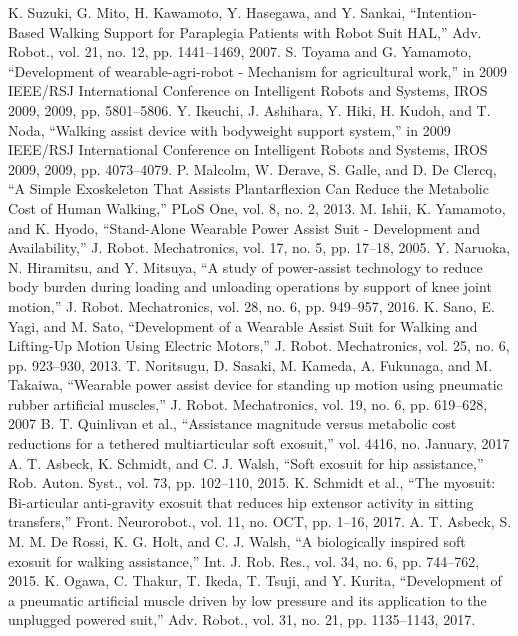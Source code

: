 \documentclass[paper,JRM,paper]{jaciiiarticle}
\begin{document}
\begin{thebibliography}{99}

	K. Suzuki, G. Mito, H. Kawamoto, Y. Hasegawa, and Y. Sankai, “Intention-Based Walking Support for Paraplegia Patients with Robot Suit HAL,” Adv. Robot., vol. 21, no. 12, pp. 1441–1469, 2007.
	S. Toyama and G. Yamamoto, “Development of wearable-agri-robot - Mechanism for agricultural work,” in 2009 IEEE/RSJ International Conference on Intelligent Robots and Systems, IROS 2009, 2009, pp. 5801–5806.
	Y. Ikeuchi, J. Ashihara, Y. Hiki, H. Kudoh, and T. Noda, “Walking assist device with bodyweight support system,” in 2009 IEEE/RSJ International Conference on Intelligent Robots and Systems, IROS 2009, 2009, pp. 4073–4079.
	P. Malcolm, W. Derave, S. Galle, and D. De Clercq, “A Simple Exoskeleton That Assists Plantarflexion Can Reduce the Metabolic Cost of Human Walking,” PLoS One, vol. 8, no. 2, 2013.
	M. Ishii, K. Yamamoto, and K. Hyodo, “Stand-Alone Wearable Power Assist Suit - Development and Availability,” J. Robot. Mechatronics, vol. 17, no. 5, pp. 17–18, 2005.
	Y. Naruoka, N. Hiramitsu, and Y. Mitsuya, “A study of power-assist technology to reduce body burden during loading and unloading operations by support of knee joint motion,” J. Robot. Mechatronics, vol. 28, no. 6, pp. 949–957, 2016.
	K. Sano, E. Yagi, and M. Sato, “Development of a Wearable Assist Suit for Walking and Lifting-Up Motion Using Electric Motors,” J. Robot. Mechatronics, vol. 25, no. 6, pp. 923–930, 2013.
	T. Noritsugu, D. Sasaki, M. Kameda, A. Fukunaga, and M. Takaiwa, “Wearable power assist device for standing up motion using pneumatic rubber artificial muscles,” J. Robot. Mechatronics, vol. 19, no. 6, pp. 619–628, 2007
	B. T. Quinlivan et al., “Assistance magnitude versus metabolic cost reductions for a tethered multiarticular soft exosuit,” vol. 4416, no. January, 2017
	A. T. Asbeck, K. Schmidt, and C. J. Walsh, “Soft exosuit for hip assistance,” Rob. Auton. Syst., vol. 73, pp. 102–110, 2015.
	K. Schmidt et al., “The myosuit: Bi-articular anti-gravity exosuit that reduces hip extensor activity in sitting transfers,” Front. Neurorobot., vol. 11, no. OCT, pp. 1–16, 2017.
	A. T. Asbeck, S. M. M. De Rossi, K. G. Holt, and C. J. Walsh, “A biologically inspired soft exosuit for walking assistance,” Int. J. Rob. Res., vol. 34, no. 6, pp. 744–762, 2015.
	K. Ogawa, C. Thakur, T. Ikeda, T. Tsuji, and Y. Kurita, “Development of a pneumatic artificial muscle driven by low pressure and its application to the unplugged powered suit,” Adv. Robot., vol. 31, no. 21, pp. 1135–1143, 2017.

\end{thebibliography}
\end{document}
